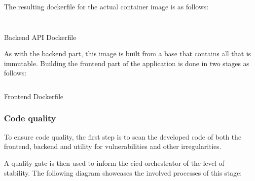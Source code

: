 The resulting dockerfile for the actual container image is as follows: 

\begin{listing}[H]
    \inputminted[firstline=1,lastline=30]{Dockerfile}{codeListing/syst_backend_Dockerfile}
\end{listing}
\begin{listing}[H]
     \inputminted[firstline=31]{Dockerfile}{codeListing/syst_backend_Dockerfile}
    \caption{Backend API Dockerfile}
    \label{lst:API Dockerfile}
\end{listing}
 


As with the backend part, this image is built from a base that contains all that is immutable. Building the frontend part of the application is done in two stages as follows: 

 \begin{listing}[H]
    \inputminted{Dockerfile}{codeListing/syst_frontend_Dockerfile}
    \caption{Frontend Dockerfile}
    \label{lst:Dind Dockerfile}
\end{listing}


 
\subsubsection{Code quality }


To ensure code quality, the first step is to scan the developed code of both the frontend, backend and utility for vulnerabilities and other irregularities.  

A quality gate is then used to inform the cicd orchestrator of the level of stability. The following diagram showcases the involved processes of this stage: 

